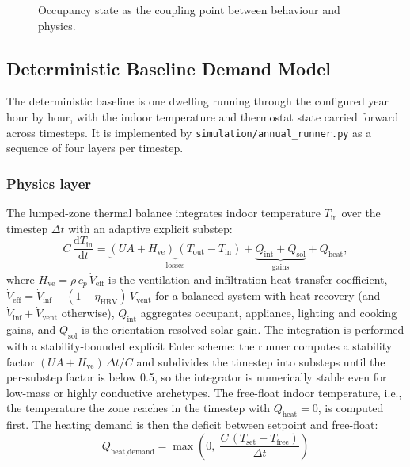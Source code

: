 \begin{figure}[ht]
  \caption{Occupancy state as the coupling point between behaviour
  and physics.}
  \label{fig:occupancy_coupling}
\end{figure}



\subsection{Deterministic Baseline Demand Model}
\label{sec:deterministicBaselineDemandModel}

The deterministic baseline is one dwelling running through the configured year hour by hour, with the indoor temperature and thermostat state carried forward across timesteps. It is implemented by \texttt{simulation/annual\_runner.py} as a sequence of four layers per timestep.

\subsubsection*{Physics layer}
The lumped-zone thermal balance integrates indoor temperature $T_{\text{in}}$ over the timestep $\Delta t$ with an adaptive explicit substep:
\begin{equation}
  C\,\frac{\mathrm{d}T_{\text{in}}}{\mathrm{d}t}
  = \underbrace{(UA + H_{\text{ve}})\,(T_{\text{out}} - T_{\text{in}})}_{\text{losses}}
  + \underbrace{Q_{\text{int}} + Q_{\text{sol}}}_{\text{gains}}
  + Q_{\text{heat}},
  \label{eq:thermal_balance}
\end{equation} where $H_{\text{ve}} = \rho\, c_p\, \dot V_{\text{eff}}$ is the ventilation-and-infiltration heat-transfer coefficient, $\dot V_{\text{eff}} = \dot V_{\text{inf}} + (1 - \eta_{\text{HRV}})\, \dot V_{\text{vent}}$ for a balanced system with heat recovery (and $\dot V_{\text{inf}} + \dot V_{\text{vent}}$ otherwise), $Q_{\text{int}}$ aggregates occupant, appliance, lighting and cooking gains, and $Q_{\text{sol}}$ is the orientation-resolved solar gain. The integration is performed with a stability-bounded explicit Euler scheme: the runner computes a stability factor $(UA + H_{\text{ve}})\,\Delta t / C$ and subdivides the timestep into substeps until the per-substep factor is below \num{0.5}, so the integrator is numerically stable even for low-mass or highly conductive archetypes.
\newline The free-float indoor temperature, i.e., the temperature the zone reaches in the timestep with $Q_{\text{heat}}=0$, is computed first. The heating demand is then the deficit between setpoint and free-float:
\begin{equation}
  Q_{\text{heat,demand}}
  = \max\!\left(0,\; \frac{C\,(T_{\text{set}} - T_{\text{free}})}{\Delta t}\right)
  \label{eq:heating_demand}
\end{equation}

